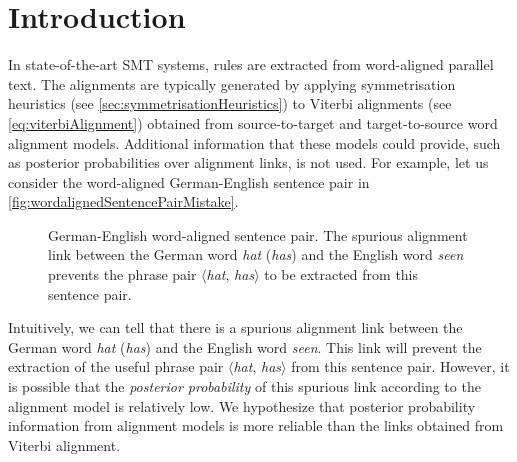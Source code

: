 \section{Introduction}
\label{sec:extractionFromPosteriorsIntro}

In state-of-the-art SMT systems, rules are extracted from %
word-aligned parallel text. The alignments are typically generated by
applying symmetrisation
heuristics (see \autoref{sec:symmetrisationHeuristics}) to Viterbi
alignments (see \autoref{eq:viterbiAlignment}) obtained
from source-to-target and target-to-source word alignment models.
Additional information that these models could provide, such as posterior
probabilities over alignment links, is not used. For example, let us consider
the word-aligned German-English sentence pair in
\autoref{fig:wordalignedSentencePairMistake}.
%
\begin{figure}
  \begin{center}
  \end{center}
  \caption{German-English word-aligned sentence pair. The spurious alignment
  link between the German word \emph{hat} (\emph{has}) and the English word \emph{seen}
  prevents the phrase pair $\langle$\emph{hat}, \emph{has}$\rangle$ to be extracted from this
  sentence pair.}
  \label{fig:wordalignedSentencePairMistake}
\end{figure}
%
Intuitively, we can tell that
there is a spurious alignment link between the German
word \emph{hat} (\emph{has}) and the
English word \emph{seen}. This link will prevent the extraction of the useful
phrase pair $\langle$\emph{hat}, \emph{has}$\rangle$
from this sentence pair. However, it is
possible that the \emph{posterior probability} of this spurious link according
to the alignment model is relatively low. We hypothesize that posterior
probability information from alignment models is more reliable than the links
obtained from Viterbi alignment.

